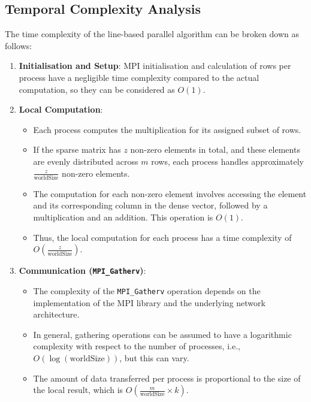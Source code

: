 \documentclass[12pt,oneside]{book} %
\begin{document}
\subsection{Temporal Complexity Analysis}
The time complexity of the line-based parallel algorithm can be broken down as
follows:

\begin{enumerate}
    \item \textbf{Initialisation and Setup}:
          MPI initialisation and calculation of rows per process have a negligible time
          complexity compared to the actual computation, so they can be considered as \(
          O(1) \).

    \item \textbf{Local Computation}:
          \begin{itemize}
              \item Each process computes the multiplication for its assigned subset of rows.
              \item If the sparse matrix has \( z \) non-zero elements in total, and these elements
                    are evenly distributed across \( m \) rows, each process handles approximately
                    \( \frac{z}{\text{worldSize}} \) non-zero elements.
              \item The computation for each non-zero element involves accessing the element and
                    its corresponding column in the dense vector, followed by a multiplication and
                    an addition. This operation is \( O(1) \).
              \item Thus, the local computation for each process has a time complexity of \(
                    O\left(\frac{z}{\text{worldSize}}\right) \).
          \end{itemize}

    \item \textbf{Communication (\texttt{MPI\_Gatherv})}:
          \begin{itemize}
              \item The complexity of the \texttt{MPI\_Gatherv} operation depends on the
                    implementation of the MPI library and the underlying network architecture.
              \item In general, gathering operations can be assumed to have a logarithmic
                    complexity with respect to the number of processes, i.e., \(
                    O(\log(\text{worldSize})) \), but this can vary.
              \item The amount of data transferred per process is proportional to the size of the
                    local result, which is \( O\left(\frac{m}{\text{worldSize}} \times k\right) \).
          \end{itemize}


\end{enumerate}
\end{document}
